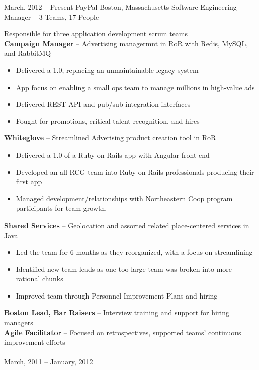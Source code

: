 \documentclass[]{friggeri-cv}
\begin{document}
\begin{entrylist}
  \entryalt
    {March, 2012 -- Present}
    {PayPal}
    {Boston, Massachusetts}
    {Software Engineering Manager -- 3 Teams, 17 People}
    {Responsible for three application development scrum teams \\
      \textbf{Campaign Manager} -- Advertising managermnt in RoR with Redis, MySQL,
      and RabbitMQ
    \begin{itemize}
      \item Delivered a 1.0, replacing an unmaintainable legacy system
      \item App focus on enabling a small ops team to manage millions in
        high-value ads
      \item Delivered REST API and pub/sub integration interfaces
      \item Fought for promotions, critical talent recognition, and hires
    \end{itemize}
      \textbf{Whiteglove} -- Streamlined Adverising product creation tool in RoR
    \begin{itemize}
      \item Delivered a 1.0 of a Ruby on Rails app with Angular front-end
      \item Developed an all-RCG team into Ruby on Rails professionals
        producing their first app
      \item Managed development/relationships with Northeastern Coop program
        participants for team growth.
    \end{itemize} 
      \textbf{Shared Services} -- Geolocation and assorted related place-centered
      services in Java
    \begin{itemize}
      \item Led the team for 6 months as they reorganized, with a focus on
        streamlining
      \item Identified new team leads as one too-large team was broken
        into more rational chunks
      \item Improved team through Personnel Improvement Plans and hiring
    \end{itemize}}
    \textbf{Boston Lead, Bar Raisers} -- Interview training and support for hiring managers\\
    \textbf{Agile Facilitator} -- Focused on retrospectives, supported teams' continuous improvement efforts\\
    \\
    \entryalt
    {March, 2011 -- January, 2012}

\end{entrylist}
\end{document}
